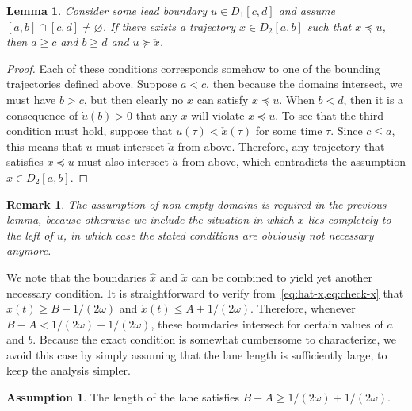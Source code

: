 \documentclass[a4paper]{report}
\theoremstyle{definition}
\newtheorem{assump}{Assumption}[chapter]
\theoremstyle{plain}
\newtheorem{lemma}{Lemma}[chapter]
\newtheorem*{remark}{Remark}
\begin{document}
\begin{lemma}\label{lemma:necessary-conditions}
  Consider some lead boundary $u \in D_{1}[c,d]$ and assume
  $[a,b] \cap [c,d] \neq \varnothing$. If there exists a trajectory
  $x \in D_{2}[a, b]$ such that $x \preceq u$, then $a \geq c$ and $b \geq d$ and $u \succeq \check{x}$.
\end{lemma}
\pagebreak[1]
\begin{proof}
  Each of these conditions corresponds somehow to one of the bounding
  trajectories defined above.
  Suppose $a < c$, then because the domains intersect, we must have $b > c$, but
  then clearly no $x$ can satisfy $x \preceq u$.
  When $b < d$, then it is a consequence of $\dot{u}(b) > 0$ that any $x$ will
  violate $x \preceq u$.
  To see that the third condition must hold, suppose that $u(\tau) < \check{x}(\tau)$
  for some time $\tau$. Since $c \leq a$, this means that $u$ must intersect
  $\check{a}$ from above. Therefore, any trajectory that satisfies $x \preceq u$
  must also intersect $\check{a}$ from above, which contradicts the assumption
  $x \in D_{2}[a,b]$.
\end{proof}

\begin{remark}
  The assumption of non-empty domains is required in the previous lemma, because
  otherwise we include the situation in which $x$ lies completely to the left of
  $u$, in which case the stated conditions are obviously not necessary anymore.
\end{remark}

We note that the boundaries $\hat{x}$ and $\check{x}$ can be combined to
yield yet another necessary condition.
%
It is straightforward to verify from~\cref{eq:hat-x,eq:check-x} that
$\hat{x}(t) \geq B - 1/(2\bar{\omega})$ and $\check{x}(t) \leq A + 1/(2\omega)$.
%
Therefore, whenever $B - A < 1/(2\bar{\omega}) + 1/(2\omega)$, these boundaries intersect
for certain values of $a$ and $b$.
%
Because the exact condition is somewhat cumbersome to characterize, we avoid
this case by simply assuming that the lane length is sufficiently large, to keep
the analysis simpler.

\begin{assump}\label{assump:lane-length}
  The length of the lane satisfies $B - A \geq 1/(2\omega) + 1/(2\bar{\omega})$.
\end{assump}
\end{document}
